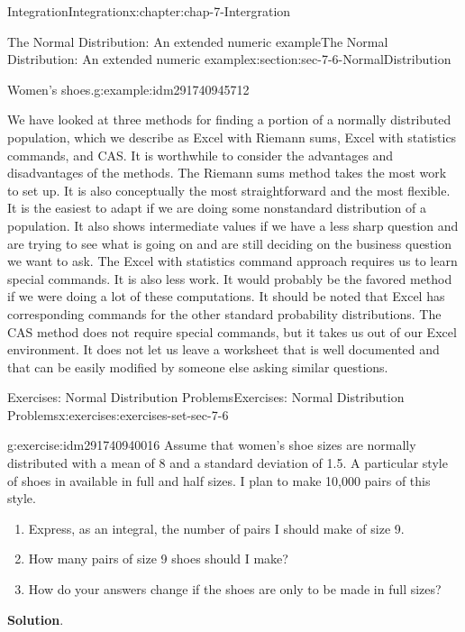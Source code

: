 \documentclass[oneside,10pt,]{book}
\numberwithin{equation}{section}
\begin{document}
\begin{chapterptx}{Integration}{}{Integration}{}{}{x:chapter:chap-7-Intergration}
\begin{sectionptx}{The Normal Distribution: An extended numeric example}{}{The Normal Distribution: An extended numeric example}{}{}{x:section:sec-7-6-NormalDistribution}
\begin{example}{Women's shoes.}{g:example:idm291740945712}
\end{example}
We have looked at three methods for finding a portion of a normally distributed population, which we describe as Excel with Riemann sums, Excel with statistics commands, and CAS.  It is worthwhile to consider the advantages and disadvantages of the methods.  The Riemann sums method takes the most work to set up.  It is also conceptually the most straightforward and the most flexible.  It is the easiest to adapt if we are doing some nonstandard distribution of a population.  It also shows intermediate values if we have a less sharp question and are trying to see what is going on and are still deciding on the business question we want to ask.  The Excel with statistics command approach requires us to learn special commands.  It is also less work.  It would probably be the favored method if we were doing a lot of these computations.  It should be noted that Excel has corresponding commands for the other standard probability distributions. The CAS method does not require special commands, but it takes us out of our Excel environment.  It does not let us leave a worksheet that is well documented and that can be easily modified by someone else asking similar questions.%
%
%
\typeout{************************************************}
\typeout{************************************************}
%
\begin{exercises-subsection}{Exercises: Normal Distribution Problems}{}{Exercises: Normal Distribution Problems}{}{}{x:exercises:exercises-set-sec-7-6}
\begin{divisionexercise}{1}{}{}{g:exercise:idm291740940016}%
Assume that women’s shoe sizes are normally distributed with a mean of 8 and a standard deviation of 1.5.  A particular style of shoes in available in full and half sizes.  I plan to make 10,000 pairs of this style.%
%
\begin{enumerate}[label=(\alph*)]
\textgreater{} \item{}Express, as an integral, the number of pairs I should make of size 9.%
\item{}How many pairs of size 9 shoes should I make?%
\item{}How do your answers change if the shoes are only to be made in full sizes?%
\end{enumerate}
\par\smallskip%
\noindent\textbf{Solution}.\hypertarget{g:solution:idm291740936688}{}\quad{}%
\begin{enumerate}[label=(\alph*)]

\end{enumerate}
\end{divisionexercise}
\end{exercises-subsection}
\end{sectionptx}
\end{chapterptx}
\end{document}
